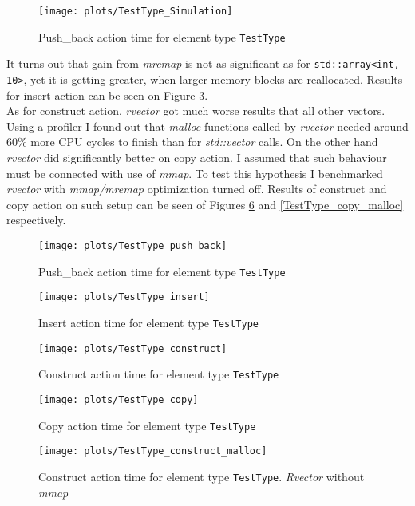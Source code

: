 \documentclass[inz, english, shortabstract]{iithesis}
\begin{document}
\begin{figure}[h!]
\caption{Push\_back action time for element type \lstinline{TestType}}
\label{TestType_push_back}
\texttt{[image: plots/TestType\_Simulation]}
\end{figure}

It turns out that gain from {\it mremap} is not as significant as for \lstinline{std::array<int, 10>}, yet it is getting greater, when larger memory blocks are reallocated. Results for insert action can be seen on Figure \ref{TestType_insert}. 
\\


As for construct action, {\it rvector} got much worse results that all other vectors. Using a profiler I found out that {\it malloc} functions called by {\it rvector} needed around 60\% more CPU cycles to finish than for {\it std::vector} calls. On the other hand {\it rvector} did significantly better on copy action. I assumed that such behaviour must be connected with use of {\it mmap}. To test this hypothesis I benchmarked {\it rvector} with {\it mmap/mremap} optimization turned off. Results of construct and copy action on such setup can be seen of Figures \ref{TestType_construct_malloc} and \ref{TestType_copy_malloc} respectively. 
\begin{figure}[h!]
\caption{Push\_back action time for element type \lstinline{TestType}}
\label{TestType_push_back}
\texttt{[image: plots/TestType\_push\_back]}
\end{figure}

\begin{figure}[h!]
\caption{Insert action time for element type \lstinline{TestType}}
\label{TestType_insert}
\texttt{[image: plots/TestType\_insert]}
\end{figure}

\begin{figure}[h!]
\caption{Construct action time for element type \lstinline{TestType}}
\label{TestType_construct}
\texttt{[image: plots/TestType\_construct]}
\end{figure}

\begin{figure}[h!]
\caption{Copy action time for element type \lstinline{TestType}}
\label{TestType_copy}
\texttt{[image: plots/TestType\_copy]}
\end{figure}


\begin{figure}[h!]
\caption{Construct action time for element type \lstinline{TestType}. {\it Rvector} without {\it mmap}}
\label{TestType_construct_malloc}
\texttt{[image: plots/TestType\_construct\_malloc]}
\end{figure}
\end{document}
